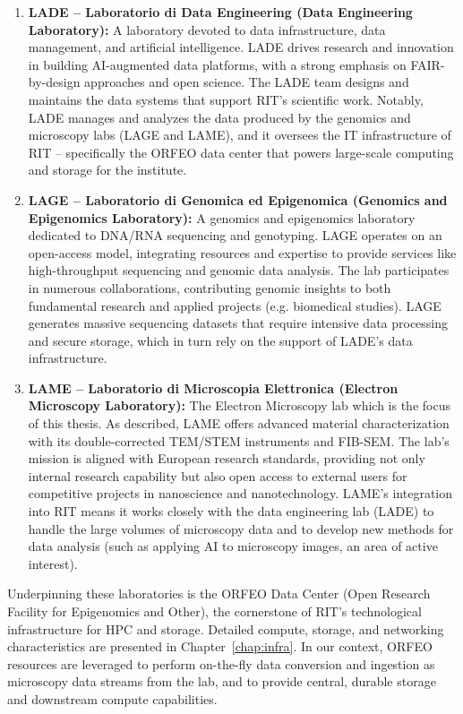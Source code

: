 \begin{enumerate}
	\item \textbf{LADE – Laboratorio di Data Engineering (Data Engineering Laboratory):}  
	A laboratory devoted to data infrastructure, data management, and artificial intelligence. LADE drives research and innovation in building AI-augmented data platforms, with a strong emphasis on FAIR-by-design approaches and open science. The LADE team designs and maintains the data systems that support RIT’s scientific work. Notably, LADE manages and analyzes the data produced by the genomics and microscopy labs (LAGE and LAME), and it oversees the IT infrastructure of RIT – specifically the ORFEO data center that powers large-scale computing and storage for the institute.
	
	\item \textbf{LAGE – Laboratorio di Genomica ed Epigenomica (Genomics and Epigenomics Laboratory):}  
	A genomics and epigenomics laboratory dedicated to DNA/RNA sequencing and genotyping. LAGE operates on an open-access model, integrating resources and expertise to provide services like high-throughput sequencing and genomic data analysis. The lab participates in numerous collaborations, contributing genomic insights to both fundamental research and applied projects (e.g. biomedical studies). LAGE generates massive sequencing datasets that require intensive data processing and secure storage, which in turn rely on the support of LADE’s data infrastructure.
	
	\item \textbf{LAME – Laboratorio di Microscopia Elettronica (Electron Microscopy Laboratory):}  
	The Electron Microscopy lab which is the focus of this thesis. As described, LAME offers advanced material characterization with its double-corrected TEM/STEM instruments and FIB-SEM. The lab’s mission is aligned with European research standards, providing not only internal research capability but also open access to external users for competitive projects in nanoscience and nanotechnology. LAME’s integration into RIT means it works closely with the data engineering lab (LADE) to handle the large volumes of microscopy data and to develop new methods for data analysis (such as applying AI to microscopy images, an area of active interest).
\end{enumerate}

\noindent Underpinning these laboratories is the ORFEO Data Center (Open Research Facility for Epigenomics and Other), the cornerstone of RIT’s technological infrastructure for HPC and storage. Detailed compute, storage, and networking characteristics are presented in Chapter~\ref{chap:infra}. In our context, ORFEO resources are leveraged to perform on-the-fly data conversion and ingestion as microscopy data streams from the lab, and to provide central, durable storage and downstream compute capabilities.


